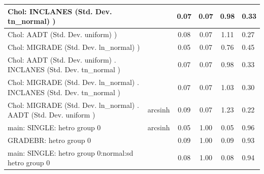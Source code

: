 \begin{table}
\begin{center}
\begin{tabular}{|l|l|c|c|c|l|}
			\hline
			 Chol: INCLANES (Std. Dev. tn_normal) ) &  & 0.07 & 0.07 & 0.98 & 0.33 \\
			\hline
			 Chol: AADT (Std. Dev. uniform) ) &  & 0.08 & 0.07 & 1.11 & 0.27 \\
			\hline
			 Chol: MIGRADE (Std. Dev. ln_normal) ) &  & 0.05 & 0.07 & 0.76 & 0.45 \\
			\hline
			 Chol: AADT (Std. Dev. uniform) . INCLANES (Std. Dev.   tn_normal ) &  & 0.07 & 0.07 & 0.98 & 0.33 \\
			\hline
			 Chol: MIGRADE (Std. Dev. ln_normal) . INCLANES (Std. Dev.   tn_normal ) &  & 0.07 & 0.07 & 1.03 & 0.30 \\
			\hline
			 Chol: MIGRADE (Std. Dev. ln_normal) . AADT (Std. Dev.   uniform ) & arcsinh & 0.09 & 0.07 & 1.23 & 0.22 \\
			\hline
			main: SINGLE: hetro group 0 & arcsinh & 0.05 & 1.00 & 0.05 & 0.96 \\
			\hline
			GRADEBR: hetro group 0 &  & 0.09 & 1.00 & 0.09 & 0.93 \\
			\hline
			main: SINGLE: hetro group 0:normal:sd  hetro group 0 &  & 0.08 & 1.00 & 0.08 & 0.94 \\
			\hline
		\end{tabular}
	\end{center}
\end{table}